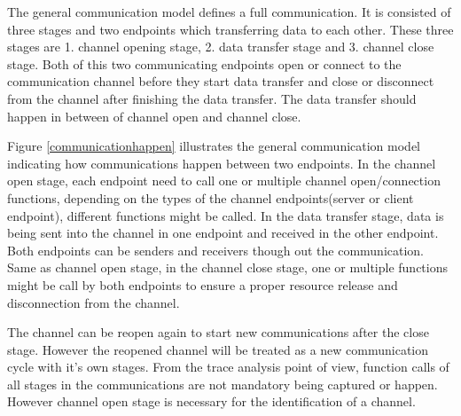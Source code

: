 The general communication model defines a full communication. It is consisted of three stages and two endpoints which transferring data to each other. These three stages are 1. channel opening stage, 2. data transfer stage and 3. channel close stage. Both of this two communicating endpoints open or connect to the communication channel before they start data transfer and close or disconnect from the channel after finishing the data transfer. The data transfer should happen in between of channel open and channel close. 

Figure \ref{communicationhappen} illustrates the general communication model indicating how communications happen between two endpoints. In the channel open stage, each endpoint need to call one or multiple channel open/connection functions, depending on the types of the channel endpoints(server or client endpoint), different functions might be called.  In the data transfer stage, data is being sent into the channel in one endpoint and received in the other endpoint. Both endpoints can be senders and receivers though out the communication. Same as channel open stage, in the channel close stage, one or multiple functions might be call by both endpoints to ensure a proper resource release and disconnection from the channel.

The channel can be reopen again to start new communications after the close stage. However the reopened channel will be treated as a new communication cycle with it's own stages. From the trace analysis point of view, function calls of all stages in the communications are not mandatory being captured or happen. However channel open stage is necessary for the identification of a channel.

